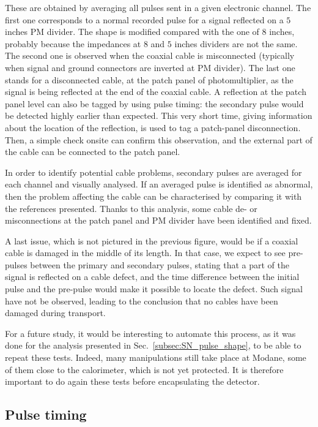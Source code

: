 These are obtained by averaging all pulses sent in a given electronic channel.
The first one corresponds to a normal recorded pulse for a signal reflected on a $5$ inches PM divider.
The shape is modified compared with the one of $8$ inches, probably because the impedances at $8$ and $5$ inches dividers are not the same.
The second one is observed when the coaxial cable is misconnected (typically when signal and ground connectors are inverted at PM divider).
The last one stands for a disconnected cable, at the patch panel of photomultiplier, as the signal is being reflected at the end of the coaxial cable.
A reflection at the patch panel level can also be tagged by using pulse timing: the secondary pulse would be detected highly earlier than expected.
This very short time, giving information about the location of the reflection, is used to tag a patch-panel disconnection.
Then, a simple check onsite can confirm this observation, and the external part of the cable can be connected to the patch panel.

In order to identify potential cable problems, secondary pulses are averaged for each channel and visually analysed.
If an averaged pulse is identified as abnormal, then the problem affecting the cable can be characterised by comparing it with the references presented.
Thanks to this analysis, some cable de- or misconnections at the patch panel and PM divider have been identified and fixed.

A last issue, which is not pictured in the previous figure, would be if a coaxial cable is damaged in the middle of its length.
In that case, we expect to see pre-pulses between the primary and secondary pulses, stating that a part of the signal is reflected on a cable defect, and the time difference between the initial pulse and the pre-pulse would make it possible to locate the defect.
Such signal have not be observed, leading to the conclusion that no cables have been damaged during transport.

For a future study, it would be interesting to automate this process, as it was done for the analysis presented in Sec.~\ref{subsec:SN_pulse_shape}, to be able to repeat these tests.
Indeed, many manipulations still take place at Modane, some of them close to the calorimeter, which is not yet protected.
It is therefore important to do again these tests before encapsulating the detector.

\subsection{Pulse timing}
\label{subsec:timing}

